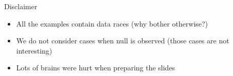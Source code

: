 %
\ifrender
\begin{frame}[fragile]{Disclaimer}%
\begin{itemize}[<+->]
\item All the examples contain data races (why bother otherwise?)
\item We do not consider cases when null is observed (those cases are not interesting)
\item Lots of brains were hurt when preparing the slides
\end{itemize}
\end{frame}
\fi
